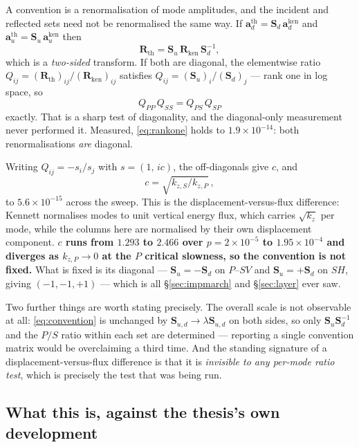 \documentclass[11pt,a4paper]{article}
\newcommand{\bS}{\mathbf{S}}
\newcommand{\bR}{\mathbf{R}}
\begin{document}
A convention is a renormalisation of mode amplitudes, and the incident and
reflected sets need not be renormalised the same way.  If
$\mathbf{a}_d^{\text{th}} = \bS_d\,\mathbf{a}_d^{\text{ken}}$ and
$\mathbf{a}_u^{\text{th}} = \bS_u\,\mathbf{a}_u^{\text{ken}}$ then
\begin{equation}\label{eq:convention}
  \bR_{\text{th}} = \bS_u\,\bR_{\text{ken}}\,\bS_d^{-1},
\end{equation}
which is a \emph{two-sided} transform.  If both are diagonal, the elementwise
ratio $Q_{ij} = (\bR_{\text{th}})_{ij}/(\bR_{\text{ken}})_{ij}$ satisfies
$Q_{ij} = (\bS_u)_i/(\bS_d)_j$ --- rank one in log space, so
\begin{equation}\label{eq:rankone}
  Q_{PP}\,Q_{SS} = Q_{PS}\,Q_{SP}
\end{equation}
exactly.  That is a sharp test of diagonality, and the diagonal-only measurement
never performed it.  Measured, \eqref{eq:rankone} holds to $1.9\times10^{-14}$:
both renormalisations \emph{are} diagonal.

Writing $Q_{ij} = -s_i/s_j$ with $s = (1,\,ic)$, the off-diagonals give $c$, and
\begin{equation}\label{eq:convratio}
  c = \sqrt{k_{z,S}/k_{z,P}}\,,
\end{equation}
to $5.6\times10^{-15}$ across the sweep.  This is the displacement-versus-flux
difference: Kennett normalises modes to unit vertical energy flux, which carries
$\sqrt{k_z}$ per mode, while the columns here are normalised by their own
displacement component.  \textbf{$c$ runs from $1.293$ to $2.466$ over
$p = 2\times10^{-5}$ to $1.95\times10^{-4}$ and diverges as
$k_{z,P}\to0$ at the $P$ critical slowness, so the convention is not fixed.}
What is fixed is its diagonal --- $\bS_u = -\bS_d$ on $P$--$SV$ and
$\bS_u = +\bS_d$ on $SH$, giving $(-1,-1,+1)$ --- which is all
\S\ref{sec:impmarch} and \S\ref{sec:layer} ever saw.

Two further things are worth stating precisely.  The overall scale is not
observable at all: \eqref{eq:convention} is unchanged by
$\bS_{u,d}\to\lambda\bS_{u,d}$ on both sides, so only $\bS_u\bS_d^{-1}$ and the $P/S$ ratio
within each set are determined --- reporting a single convention matrix would
be overclaiming a third time.  And the standing signature of a
displacement-versus-flux difference is that it is \emph{invisible to any
per-mode ratio test}, which is precisely the test that was being run.

\subsection{What this is, against the thesis's own
development}\label{sec:impedanceplace}
\end{document}

